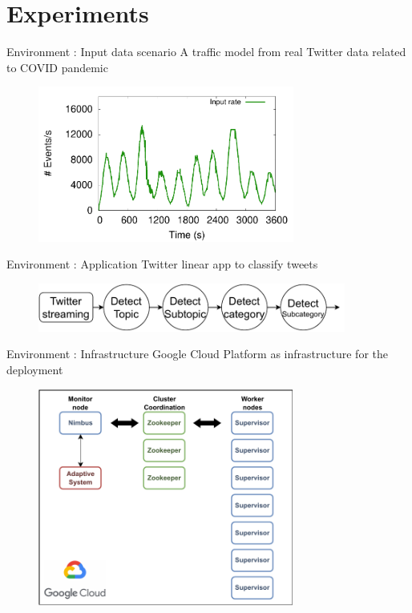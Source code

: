\section[4]{Experiments}

\begin{frame}{Environment : Input data scenario}
	A traffic model from real Twitter data related to COVID pandemic

    \begin{figure}[!ht]
        \includegraphics[width=0.75\textwidth]{images/exp/Dataset-TwitterSmoothed.pdf}
    \end{figure}
\end{frame}

\begin{frame}{Environment : Application}
	Twitter linear app to classify tweets
	\begin{figure}
		\includegraphics[width=0.9\textwidth]{images/exp/App-Twitter-Linear-1.pdf}
	\end{figure}
\end{frame}

\begin{frame}{Environment : Infrastructure}
	Google Cloud Platform as infrastructure for the deployment

	\begin{figure}
		\includegraphics[width=0.75\textwidth]{images/exp/GCP-2.pdf}
	\end{figure}
\end{frame}

